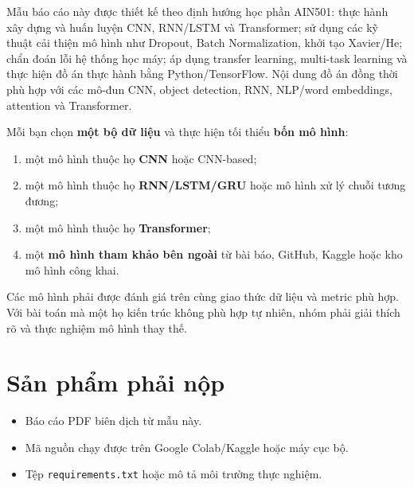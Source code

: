 \documentclass[12pt,a4paper,oneside]{report}
\newcommand{\checkitem}{\item[$\square$]}
\begin{document}
\begin{instructionbox}
Mẫu báo cáo này được thiết kế theo định hướng học phần AIN501: thực hành xây dựng và huấn luyện
CNN, RNN/LSTM và Transformer; sử dụng các kỹ thuật cải thiện mô hình như Dropout, Batch
Normalization, khởi tạo Xavier/He; chẩn đoán lỗi hệ thống học máy; áp dụng transfer learning,
multi-task learning và thực hiện đồ án thực hành bằng Python/TensorFlow. Nội dung đồ án đồng thời
phù hợp với các mô-đun CNN, object detection, RNN, NLP/word embeddings, attention và Transformer.
\end{instructionbox}

\begin{requirementbox}
Mỗi bạn chọn \textbf{một bộ dữ liệu} và thực hiện tối thiểu \textbf{bốn mô hình}:
\begin{enumerate}[leftmargin=*,itemsep=2pt]
  \item một mô hình thuộc họ \textbf{CNN} hoặc CNN-based;
  \item một mô hình thuộc họ \textbf{RNN/LSTM/GRU} hoặc mô hình xử lý chuỗi tương đương;
  \item một mô hình thuộc họ \textbf{Transformer};
  \item một \textbf{mô hình tham khảo bên ngoài} từ bài báo, GitHub, Kaggle hoặc kho mô hình công khai.
\end{enumerate}
Các mô hình phải được đánh giá trên cùng giao thức dữ liệu và metric phù hợp. Với bài toán mà một họ kiến trúc không phù hợp tự nhiên, nhóm phải giải thích rõ và thực nghiệm mô hình thay thế. 
\end{requirementbox}

\section*{Sản phẩm phải nộp}
\begin{itemize}[leftmargin=*,itemsep=3pt]
  \checkitem Báo cáo PDF biên dịch từ mẫu này.
  \checkitem Mã nguồn chạy được trên Google Colab/Kaggle hoặc máy cục bộ.
  \checkitem Tệp \texttt{requirements.txt} hoặc mô tả môi trường thực nghiệm.
  
\end{itemize}
\end{document}
